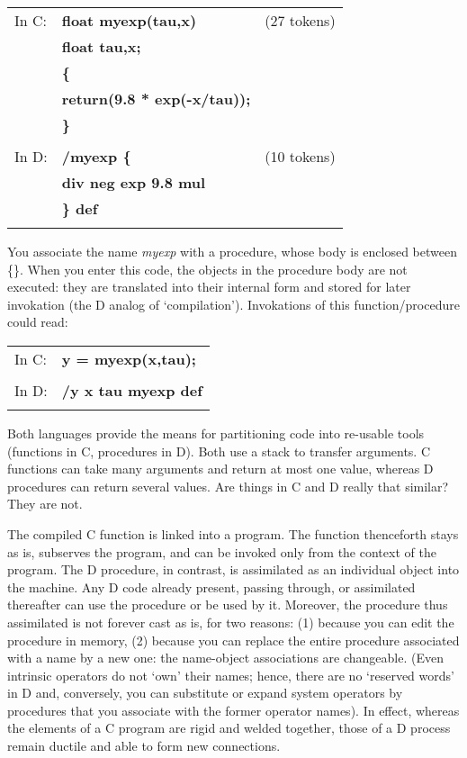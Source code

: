 \begin{tabular}{>{\normalfont}l>{\sffamily\bfseries}l>{\normalfont}r}

In C: & float myexp(tau,x) & (27 tokens)\\
      & float tau,x;\\
      & \{\\
      & return(9.8 * exp(-x/tau));\\
      & \}\\\\
In D: & /myexp \{ & (10 tokens)\\
      & div neg exp 9.8 mul\\
      & \} def\\\\
\end{tabular}

\noindent You associate the name \emph{myexp} with a procedure,  whose body is  enclosed between \{\}.  When you enter this code,  the objects in the procedure body are not executed: they are translated into their internal form and stored for later invokation (the D analog of `compilation'). Invokations of this function/procedure could read:\\

\begin{tabular}{>{\normalfont}l>{\sffamily\bfseries}l}
In C: & y = myexp(x,tau);\\\\
In D: & /y x tau myexp def\\\\
\end{tabular}

\noindent Both  languages provide the means for partitioning code  into  re-usable tools  (functions in C,  procedures in D).  Both use a stack to  transfer arguments.  C  functions can take many arguments and return at  most  one value,  whereas  D procedures can return several values. Are things in C and D really that similar? They are not.

The  compiled  C function is linked  into  a  program.  The  function thenceforth stays as is,  subserves the program,  and can be invoked only from  the  context of the program.  The  D  procedure,  in  contrast,  is assimilated as an individual object into the machine.  Any D code already present, passing through, or assimilated thereafter can use the procedure or be used by it. Moreover, the procedure thus assimilated is not forever cast as is, for two reasons: (1) because you can edit the procedure in memory, (2) because you can replace the entire procedure associated with a name by a new one: the name-object associations are changeable. (Even  intrinsic operators do not `own' their names;  hence, there are no `reserved words' in  D and, conversely, you can substitute or expand system operators by procedures that you associate with the former operator names).  In  effect,  whereas the elements of a C program are  rigid  and welded together, those of a D process remain ductile and able to form new connections.

